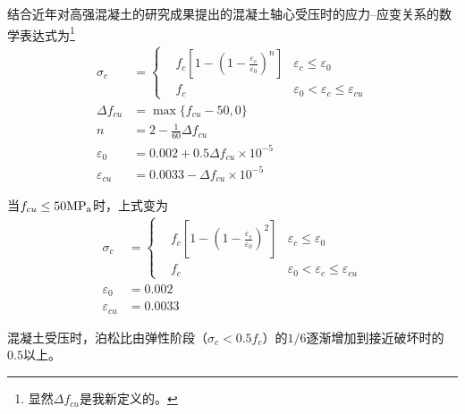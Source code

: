 \documentclass{article}
\begin{document}
\par \gb{}结合近年对高强混凝土的研究成果提出的混凝土轴心受压时的应力--应变关系的数学表达式为\footnote{显然$\Delta f_{cu}$是我新定义的。}
\begin{align*}
      \sigma_c         & =
      \left\{ \begin{aligned}
                     & f_c[1-(1-\frac{\varepsilon_c}{\varepsilon_0})^n] & \varepsilon_c \leq \varepsilon_0                    \\
                     & f_c                                              & \varepsilon_0 < \varepsilon_c \leq \varepsilon_{cu}
              \end{aligned} \right. \\
      \Delta f_{cu}    & = \max \{f_{cu}-50, 0\}                                                                        \\
      n                & = 2 - \frac{1}{60} \Delta f_{cu}                                                               \\
      \varepsilon_0    & =0.002 + 0.5 \Delta f_{cu} \times 10^{-5}                                                      \\
      \varepsilon_{cu} & =0.0033 - \Delta f_{cu} \times 10^{-5}
\end{align*}
\par 当$f_{cu} \leq 50\rm{MP_a}$时，上式变为
\begin{align*}
      \sigma_c         & =
      \left\{ \begin{aligned}
                     & f_c[1-(1-\frac{\varepsilon_c}{\varepsilon_0})^2] & \varepsilon_c \leq \varepsilon_0                    \\
                     & f_c                                              & \varepsilon_0 < \varepsilon_c \leq \varepsilon_{cu}
              \end{aligned} \right. \\
      \varepsilon_0    & =0.002                                                                                         \\
      \varepsilon_{cu} & =0.0033
\end{align*}
\par 混凝土受压时，泊松比由弹性阶段（$\sigma_c<0.5f_c$）的$1/6$逐渐增加到接近破坏时的$0.5$以上。
\end{document}
